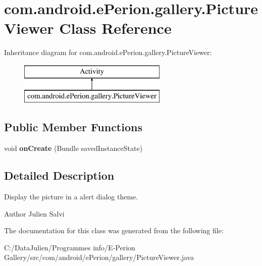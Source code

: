 \section{com.\-android.\-e\-Perion.\-gallery.\-Picture\-Viewer Class Reference}
\label{classcom_1_1android_1_1e_perion_1_1gallery_1_1_picture_viewer}
Inheritance diagram for com.\-android.\-e\-Perion.\-gallery.\-Picture\-Viewer\-:\begin{figure}[H]
\begin{center}
\leavevmode
\includegraphics[height=2.000000cm]{classcom_1_1android_1_1e_perion_1_1gallery_1_1_picture_viewer}
\end{center}
\end{figure}
\subsection*{Public Member Functions}
\begin{DoxyCompactItemize}
\item 
void {\bfseries on\-Create} (Bundle saved\-Instance\-State)\label{classcom_1_1android_1_1e_perion_1_1gallery_1_1_picture_viewer_a453cf5ab12ba7bd50fbedd175bf24d33}

\end{DoxyCompactItemize}


\subsection{Detailed Description}
Display the picture in a alert dialog theme. \begin{DoxyAuthor}{Author}
Julien Salvi 
\end{DoxyAuthor}


The documentation for this class was generated from the following file\-:\begin{DoxyCompactItemize}
\item 
C\-:/\-Data\-Julien/\-Programmes info/\-E-\/\-Perion Gallery/src/com/android/e\-Perion/gallery/Picture\-Viewer.\-java\end{DoxyCompactItemize}
